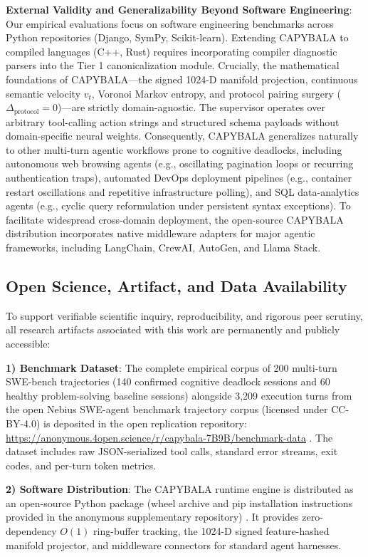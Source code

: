 \documentclass[journal]{IEEEtran}
\begin{document}
\textbf{External Validity and Generalizability Beyond Software Engineering}: Our empirical evaluations focus on software engineering benchmarks across Python repositories (Django, SymPy, Scikit-learn). Extending CAPYBALA to compiled languages (C++, Rust) requires incorporating compiler diagnostic parsers into the Tier 1 canonicalization module. Crucially, the mathematical foundations of CAPYBALA---the signed 1024-D manifold projection, continuous semantic velocity $v_t$, Voronoi Markov entropy, and protocol pairing surgery ($\Delta_{\text{protocol}} = 0$)---are strictly domain-agnostic. The supervisor operates over arbitrary tool-calling action strings and structured schema payloads without domain-specific neural weights. Consequently, CAPYBALA generalizes naturally to other multi-turn agentic workflows prone to cognitive deadlocks, including autonomous web browsing agents (e.g., oscillating pagination loops or recurring authentication traps), automated DevOps deployment pipelines (e.g., container restart oscillations and repetitive infrastructure polling), and SQL data-analytics agents (e.g., cyclic query reformulation under persistent syntax exceptions). To facilitate widespread cross-domain deployment, the open-source CAPYBALA distribution incorporates native middleware adapters for major agentic frameworks, including LangChain, CrewAI, AutoGen, and Llama Stack.

\subsection{Open Science, Artifact, and Data Availability}
To support verifiable scientific inquiry, reproducibility, and rigorous peer scrutiny, all research artifacts associated with this work are permanently and publicly accessible:

\textbf{1) Benchmark Dataset}: The complete empirical corpus of 200 multi-turn SWE-bench trajectories (140 confirmed cognitive deadlock sessions and 60 healthy problem-solving baseline sessions) alongside 3,209 execution turns from the open Nebius SWE-agent benchmark trajectory corpus (licensed under CC-BY-4.0) is deposited in the open replication repository: \url{https://anonymous.4open.science/r/capybala-7B9B/benchmark-data} \cite{capybala_kaggle_2026}. The dataset includes raw JSON-serialized tool calls, standard error streams, exit codes, and per-turn token metrics.

\textbf{2) Software Distribution}: The CAPYBALA runtime engine is distributed as an open-source Python package (wheel archive and pip installation instructions provided in the anonymous supplementary repository) \cite{capybala_pypi_2026}. It provides zero-dependency $O(1)$ ring-buffer tracking, the 1024-D signed feature-hashed manifold projector, and middleware connectors for standard agent harnesses.
\end{document}
